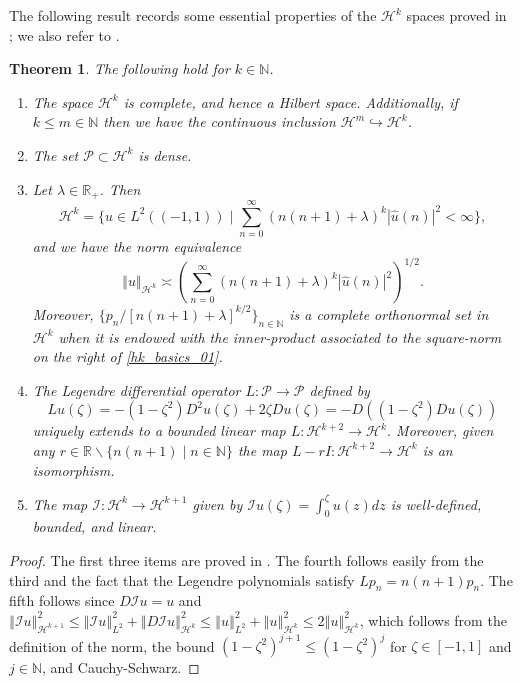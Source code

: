 \documentclass[11pt,reqno]{amsart}
\numberwithin{equation}{section}
\providecommand{\abs}[1]{\left\vert#1\right\vert}
\providecommand{\norm}[1]{\left\Vert#1\right\Vert}
\providecommand{\abs}[1]{\left\vert#1\right\vert}
\providecommand{\norm}[1]{\left\Vert#1\right\Vert}
\def\h{\mathcal{H}}
\def\N{\mathbb{N}}
\def\R{\mathbb{R}}
\def\st{\;\vert\;}
\newtheorem{thm}[lem]{Theorem}
\begin{document}
 
The following result records some essential properties of the $\h^k$ spaces proved in \cite{ELW_2002, LW_2002, LW_2013}; we also refer to \cite{FGHL_2025}.

\begin{thm}\label{hk_basics}
The following hold for $k \in \N$.
\begin{enumerate}
 \item The space $\h^k$ is complete, and hence a Hilbert space.  Additionally, if $k \le m \in \N$ then we have the continuous inclusion $\h^m \hookrightarrow \h^k$.
 \item The set $\mathcal{P} \subset \h^k$ is dense.   
 \item Let $\lambda \in \R_+$.  Then 
\begin{equation}\label{hk_basics_00}
 \h^k = \{ u \in L^2((-1,1)) \st \sum_{n=0}^\infty (n(n+1) + \lambda)^k \abs{\hat{u}(n)}^2  < \infty\},
\end{equation}
and we have the norm equivalence
\begin{equation}\label{hk_basics_01}
 \norm{u}_{\h^k} \asymp \left(\sum_{n=0}^\infty (n(n+1) + \lambda )^k \abs{\hat{u}(n)}^2  \right)^{1/2} .
\end{equation}
Moreover, $\{p_n / [n(n+1) +\lambda]^{k/2} \}_{n \in \N}$ is a complete orthonormal set in $\h^k$ when it is endowed with the inner-product associated to the square-norm on the right of \eqref{hk_basics_01}.

 \item The Legendre differential operator $L: \mathcal{P} \to \mathcal{P}$ defined by 
\begin{equation}
 Lu(\zeta) = -(1-\zeta^2) D^2 u(\zeta) + 2\zeta Du(\zeta)  = -D((1-\zeta^2) Du(\zeta))
\end{equation}
uniquely extends to a bounded linear map $L : \h^{k+2} \to \h^k$.  Moreover, given any $r \in \R \backslash \{ n (n+1) \st n \in \N\}$ the map  $L - r I : \h^{k+2} \to \h^k$  is an isomorphism.  
 \item The map $\mathcal{I} : \h^{k} \to \h^{k+1}$ given by $\mathcal{I} u(\zeta) = \int_0^\zeta u(z) dz$ is well-defined, bounded, and linear.
\end{enumerate}

\end{thm}
\begin{proof}
The first three items are proved in \cite{ELW_2002,LW_2002,LW_2013}.  The fourth follows easily from the third and the fact that the Legendre polynomials satisfy $L p_n = n(n+1) p_n$.  The fifth follows since $D\mathcal{I}u = u$ and $\norm{\mathcal{I} u}_{\h^{k+1}}^2 \le \norm{\mathcal{I} u}_{L^2}^2 + \norm{D\mathcal{I} u}_{\h^{k}}^2 \le \norm{u}_{L^2}^2 + \norm{u}_{\h^k}^2 \le 2 \norm{u}_{\h^k}^2$, which follows from the definition of the norm, the bound $(1-\zeta^2)^{j+1} \le (1-\zeta^2)^{j}$ for $\zeta \in [-1,1]$ and $j \in \N$, and Cauchy-Schwarz.
\end{proof}
\end{document}
